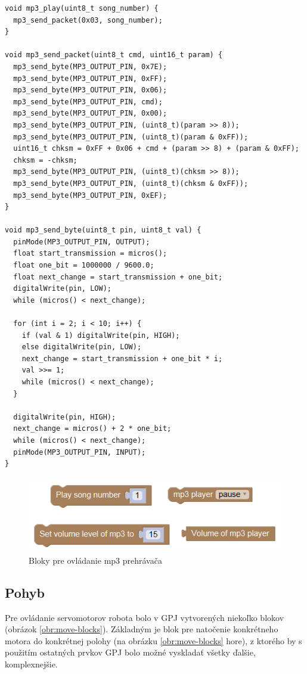 \begin{lstlisting}[frame=single]
void mp3_play(uint8_t song_number) {
  mp3_send_packet(0x03, song_number);
}

void mp3_send_packet(uint8_t cmd, uint16_t param) {
  mp3_send_byte(MP3_OUTPUT_PIN, 0x7E);
  mp3_send_byte(MP3_OUTPUT_PIN, 0xFF);
  mp3_send_byte(MP3_OUTPUT_PIN, 0x06);
  mp3_send_byte(MP3_OUTPUT_PIN, cmd);
  mp3_send_byte(MP3_OUTPUT_PIN, 0x00);
  mp3_send_byte(MP3_OUTPUT_PIN, (uint8_t)(param >> 8));
  mp3_send_byte(MP3_OUTPUT_PIN, (uint8_t)(param & 0xFF));
  uint16_t chksm = 0xFF + 0x06 + cmd + (param >> 8) + (param & 0xFF);
  chksm = -chksm;
  mp3_send_byte(MP3_OUTPUT_PIN, (uint8_t)(chksm >> 8));
  mp3_send_byte(MP3_OUTPUT_PIN, (uint8_t)(chksm & 0xFF));
  mp3_send_byte(MP3_OUTPUT_PIN, 0xEF);
}

void mp3_send_byte(uint8_t pin, uint8_t val) {
  pinMode(MP3_OUTPUT_PIN, OUTPUT);
  float start_transmission = micros();
  float one_bit = 1000000 / 9600.0;
  float next_change = start_transmission + one_bit;
  digitalWrite(pin, LOW);
  while (micros() < next_change);
  
  for (int i = 2; i < 10; i++) {
    if (val & 1) digitalWrite(pin, HIGH);
    else digitalWrite(pin, LOW);
    next_change = start_transmission + one_bit * i;
    val >>= 1;
    while (micros() < next_change);
  }

  digitalWrite(pin, HIGH);
  next_change = micros() + 2 * one_bit;
  while (micros() < next_change);
  pinMode(MP3_OUTPUT_PIN, INPUT);
}
\end{lstlisting}

\begin{figure}
\centerline{\includegraphics[]{images/mp3-blocks}}
\caption[Bloky pre ovládanie mp3 prehrávača]{Bloky pre ovládanie mp3 prehrávača}
\label{obr:mp3-blocks}
\end{figure}

\newpage

\subsection{Pohyb}
Pre ovládanie servomotorov robota bolo v GPJ vytvorených niekoľko blokov (obrázok \ref{obr:move-blocks}). Základným je blok pre natočenie konkrétneho motora do konkrétnej polohy (na obrázku \ref{obr:move-blocks} hore), z ktorého by s použitím ostatných prvkov GPJ bolo možné vyskladať všetky ďalšie, komplexnejšie.

